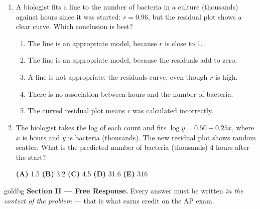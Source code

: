 \documentclass[12pt]{article}
\begin{document}
\begin{enumerate}[leftmargin=1.9em, itemsep=0.10in]

  \item A biologist fits a line to the number of bacteria in a culture (thousands) against
        hours since it was started: $r = 0.96$, but the residual plot shows a clear curve.
        Which conclusion is best?
        \begin{enumerate}[label=\textbf{(\Alph*)}, leftmargin=2.2em, itemsep=1pt]
          \item The line is an appropriate model, because $r$ is close to 1.
          \item The line is an appropriate model, because the residuals add to zero.
          \item A line is not appropriate: the residuals curve, even though $r$ is high.
          \item There is no association between hours and the number of bacteria.
          \item The curved residual plot means $r$ was calculated incorrectly.
                \hfill{}\rule[-0.2in]{0pt}{0.48in}
        \end{enumerate}

  \item The biologist takes the log of each count and fits $\widehat{\log y} = 0.50 + 0.25x$,
        where $x$ is hours and $y$ is bacteria (thousands). The new residual plot shows random
        scatter. What is the predicted number of bacteria (thousands) 4 hours after the start?\hfill{}\rule[-0.2in]{0pt}{0.48in}
        \par\vspace{3pt}\noindent
        \hspace{1.2em}\textbf{(A)} 1.5 \hfill \textbf{(B)} 3.2 \hfill
        \textbf{(C)} 4.5 \hfill \textbf{(D)} 31.6 \hfill \textbf{(E)} 316

\end{enumerate}

\vspace{0.08in}

\boxguard[27]
\begin{headlinebox}{goldbg}
\small
\textbf{Section II --- Free Response.} Every answer must be written \emph{in the context of the
problem} --- that is what earns credit on the AP exam.
\end{headlinebox}
\end{document}
